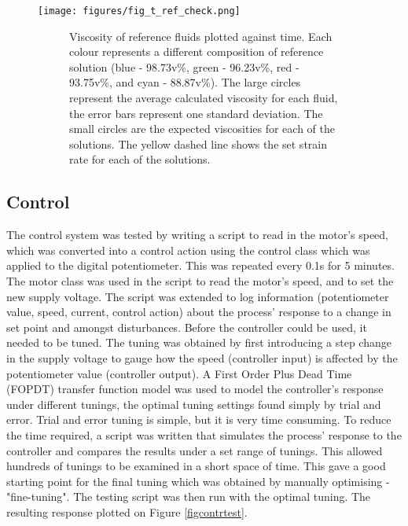 \documentclass[twoside,a4]{report}
\def\br{\newline \newline \noindent}
\begin{document}

	\noindent
	\begin{figure}[!htb]
		\centering
		\texttt{[image: figures/fig\_t\_ref\_check.png]}
		\caption{Torque Calibration Check}
		\label{figrheotestres}
		\begin{subfigure}{0.9\textwidth}
			\footnotesize Viscosity of reference fluids plotted against time. Each colour represents a different composition of reference solution (blue - 98.73v\%, green - 96.23v\%, red - 93.75v\%, and cyan - 88.87v\%). The large circles represent the average calculated viscosity for each fluid, the error bars represent one standard deviation. The small circles are the expected viscosities for each of the solutions. The yellow dashed line shows the set strain rate for each of the solutions.
		\end{subfigure}
	\end{figure}

	\subsection*{Control}
	The control system was tested by writing a script to read in the motor's speed, which was converted into a control action using the control class which was applied to the digital potentiometer. This was repeated every 0.1s for 5 minutes. The motor class was used in the script to read the motor's speed, and to set the new supply voltage. The script was extended to log information (potentiometer value, speed, current, control action) about the process' response to a change in set point and amongst disturbances.
	\br
	Before the controller could be used, it needed to be tuned. The tuning was obtained by first introducing a step change in the supply voltage to gauge how the speed (controller input) is affected by the potentiometer value (controller output). A First Order Plus Dead Time (FOPDT) transfer function model was used to model the controller's response under different tunings, the optimal tuning settings found simply by trial and error.
	\br
	Trial and error tuning is simple, but it is very time consuming. To reduce the time required, a script was written that simulates the process' response to the controller and compares the results under a set range of tunings. This allowed hundreds of tunings to be examined in a short space of time. This gave a good starting point for the final tuning which was obtained by manually optimising - "fine-tuning". The testing script was then run with the optimal tuning. The resulting response plotted on Figure \ref{figcontrtest}.
	
\end{document}

